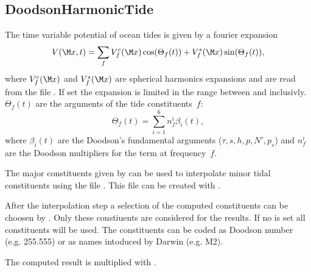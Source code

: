 \subsection{DoodsonHarmonicTide}\label{tidesType:doodsonHarmonicTide}
The time variable potential of ocean tides is given by a fourier expansion
\begin{equation}
V(\M x,t) = \sum_{f} V_f^c(\M x)\cos(\Theta_f(t)) + V_f^s(\M x)\sin(\Theta_f(t)),
\end{equation}
where $V_f^c(\M x)$ and $V_f^s(\M x)$ are spherical harmonics expansions and are
read from the file .
If set the expansion is limited in the range between 
and  inclusivly.
$\Theta_f(t)$ are the arguments of the tide constituents~$f$:
\begin{equation}
\Theta_f(t) = \sum_{i=1}^6 n_f^i\beta_i(t),
\end{equation}
where $\beta_i(t)$ are the Doodson's fundamental arguments ($\tau,s,h,p,N',p_s$)
and $n_f^i$ are the Doodson multipliers for the term at frequency~$f$.

The major constituents given by  can be used to
interpolate minor tidal constituents using the file .
This file can be created with .

After the interpolation step a selection of the computed constituents can be
choosen by . Only these constiuents are considered for the results.
If no  is set all constituents will be used. The constituents can
be coded as Doodson number (e.g. 255.555) or as names intoduced by Darwin (e.g. M2).

The computed result is multiplied with .


